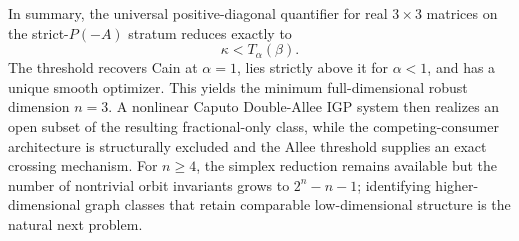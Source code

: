 In summary, the universal positive-diagonal quantifier for real \(3\times3\) matrices on the strict-\(P(-A)\) stratum reduces exactly to
\[
\kappa<T_\alpha(\beta).
\]
The threshold recovers Cain at \(\alpha=1\), lies strictly above it for \(\alpha<1\), and has a unique smooth optimizer. This yields the minimum full-dimensional robust dimension \(n=3\). A nonlinear Caputo Double-Allee IGP system then realizes an open subset of the resulting fractional-only class, while the competing-consumer architecture is structurally excluded and the Allee threshold supplies an exact crossing mechanism. For \(n\ge4\), the simplex reduction remains available but the number of nontrivial orbit invariants grows to \(2^n-n-1\); identifying higher-dimensional graph classes that retain comparable low-dimensional structure is the natural next problem.
